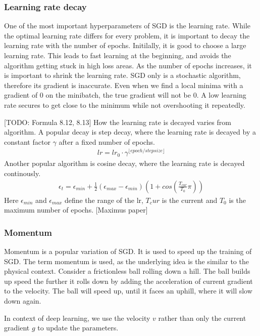 \subsubsection{Learning rate decay}\label{sub:Learing_rate_decay}
One of the most important hyperparameters of SGD is the learning rate. While the
optimal learning rate differs for every problem, it is important to decay the
learning rate with the number of epochs. Initilally, it is good to choose a
large learning rate. This leads to fast learning at the beginning, and avoids
the algorithm getting stuck in high loss areas. As the number of epochs
increases, it is important to shrink the learning rate. SGD only is a stochastic
algorithm, therefore its gradient is inaccurate. Even when we find a local
minima with a gradient of 0 on the minibatch, the true gradient will not be 0. A
low learning rate secures to get close to the minimum while not overshooting it
repeatedly.

[TODO: Formula 8.12, 8.13] How the learning rate is decayed varies from
algorithm. A popular decay is step decay, where the learning rate is decayed by
a constant factor $\gamma$ after a fixed number of epochs.
\begin{align}
    lr = lr_0 \cdot \gamma^{\lfloor epoch/stepsize \rfloor}
\end{align}
Another popular algorithm is cosine decay, where the learning rate is decayed
continously.
\begin{align}\label{eq:cosine_decay}
    \epsilon_t = \epsilon_{min} + \frac{1}{2} (\epsilon_{max} - \epsilon_{min})(1+cos(\frac{T_{cur}}{T_0}\pi))
\end{align}
Here $\epsilon_{min}$ and $\epsilon_{max}$ define the range of the lr, $T_cur$ is
the current and $T_0$ is the maximum number of epochs.
[Maximus paper]

\subsubsection{Momentum}\label{sub:Momentum}
Momentum is a popular variation of SGD. It is used to speed up the training of
SGD. The term momentum is used, as the underlying idea is the similar to the
physical context. Consider a frictionless ball rolling down a hill. The ball
builds up speed the further it rolls down by adding the acceleration of current
gradient to the velocity. The ball will speed up, until it faces an uphill,
where it will slow down again.

In context of deep learning, we use the velocity $v$ rather than only the
current gradient $g$ to update the parameters.


